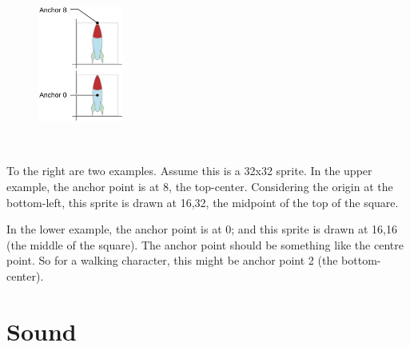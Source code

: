 \documentclass[12pt]{article}
\begin{document}
\begin{figure}
  \includegraphics[width=0.25\textwidth]{neo6502-rocket.png}
\end{figure}
~\newline

To the right are two examples. Assume this is a 32x32 sprite.
In the upper example, the anchor point is at 8, the top-center.
Considering the origin at the bottom-left,
this sprite is drawn at 16,32, the midpoint of the top of the square.
\newline

In the lower example, the anchor point is at 0;
and this sprite is drawn at 16,16 (the middle of the square).
The anchor point should be something like the centre point.
So for a walking character, this might be anchor point 2 (the bottom-center).


\pagebreak


\section{Sound}\label{sound}
\end{document}
